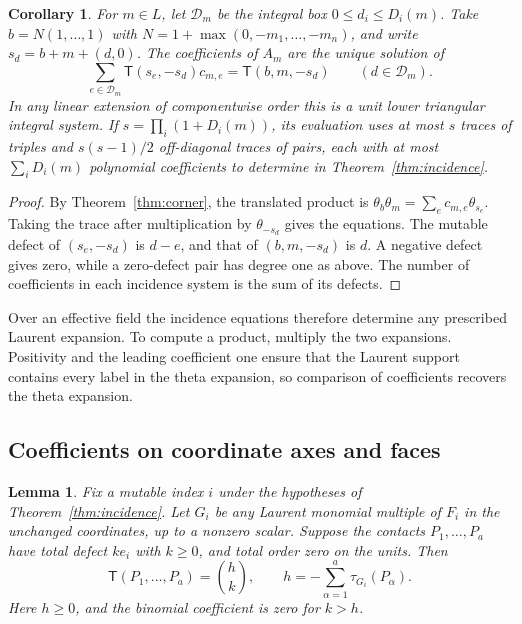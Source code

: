 \documentclass[11pt,reqno]{amsart}
\numberwithin{equation}{section}
\newtheorem{lemma}[theorem]{Lemma}
\newtheorem{corollary}[theorem]{Corollary}
\theoremstyle{definition}
\theoremstyle{remark}
\begin{document}
\begin{corollary}\label{cor:trace-reconstruction}
For \(m\in L\), let \(\mathcal D_m\) be the integral box
\(0\le d_i\le D_i(m)\). Take \(b=N(1,\ldots,1)\) with
\(N=1+\max(0,-m_1,\ldots,-m_n)\), and write \(s_d=b+m+(d,0)\).
The coefficients of \(A_m\) are the unique solution of
\[ \sum_{e\in\mathcal D_m}\mathsf T(s_e,-s_d)c_{m,e} =\mathsf T(b,m,-s_d) \qquad(d\in\mathcal D_m). \]
In any linear extension of componentwise order this is a unit lower
triangular integral system. If \(s=\prod_i(1+D_i(m))\), its evaluation
uses at most \(s\) traces of triples and \(s(s-1)/2\) off-diagonal
traces of pairs, each with at most \(\sum_iD_i(m)\) polynomial
coefficients to determine in Theorem~\ref{thm:incidence}.
\end{corollary}

\begin{proof}
By Theorem~\ref{thm:corner}, the translated product is
\(\theta_b\theta_m=\sum_e c_{m,e}\theta_{s_e}\).
Taking the trace after multiplication by \(\theta_{-s_d}\) gives
the equations. The mutable defect of \((s_e,-s_d)\) is \(d-e\),
and that of \((b,m,-s_d)\) is \(d\). A negative defect gives
zero, while a zero-defect pair has degree one as above. The number
of coefficients in each incidence system is the sum of its defects.
\end{proof}

Over an effective field the incidence equations therefore determine
any prescribed Laurent expansion. To compute a product, multiply the
two expansions. Positivity and the leading coefficient one ensure that the Laurent
support contains every label in the theta expansion, so comparison of coefficients
recovers the theta expansion.

\subsection{Coefficients on coordinate axes and faces}

\begin{lemma}\label{lem:single-axis-trace}
Fix a mutable index \(i\) under the hypotheses of
Theorem~\ref{thm:incidence}. Let \(G_i\) be any Laurent monomial
multiple of \(F_i\) in the unchanged coordinates, up to a nonzero scalar.
Suppose the contacts \(P_1,\ldots,P_a\) have total defect \(k e_i\)
with \(k\ge0\), and total order zero on the units. Then
\[ \mathsf T(P_1,\ldots,P_a)=\binom{h}{k},\qquad h=-\sum_{\alpha=1}^a\tau_{G_i}(P_\alpha). \]
Here \(h\ge0\), and the binomial coefficient is zero for \(k>h\).
\end{lemma}
\end{document}
